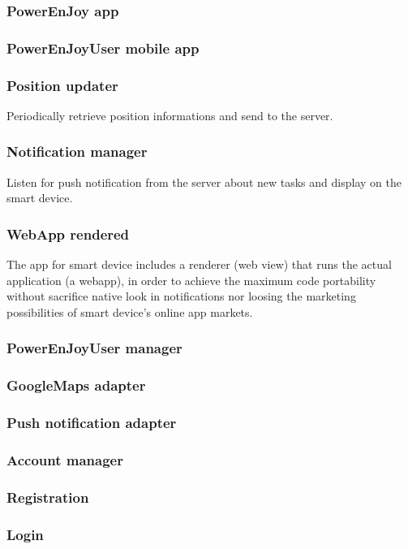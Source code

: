 \documentclass[english]{article}
\begin{document}
\subsubsection*{PowerEnJoy app}
	
	\subsubsection{PowerEnJoyUser mobile app}
		\subsubsection{Position updater}
		Periodically retrieve position informations and send to the server.
		\subsubsection{Notification manager}
		Listen for push notification from the server about new tasks and display on the smart device.
		\subsubsection{WebApp rendered}
		The app for smart device includes a renderer (web view) that runs the actual application (a webapp), in order to achieve the maximum code portability without sacrifice native look in notifications nor loosing the marketing possibilities of smart device's online app markets.
	\subsubsection{PowerEnJoyUser manager}
	\subsubsection{GoogleMaps adapter}
	\subsubsection{Push notification adapter}
	
	\subsubsection{Account manager}
		\subsubsection{Registration }
		\subsubsection{Login}
\end{document}
